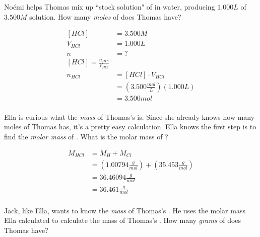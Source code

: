 \documentclass[11pt,addpoints]{exam}   	%
\begin{document}
\begin{questions}
\vspace{0.2in}


\question[5] No\'emi helps Thomas mix up ``stock solution" of  in water, producing $1.000 L$ of $3.500 M$  solution.
How many \emph{moles} of  does Thomas have?

\begin{solution}
\begin{equation} 
\begin{split}
    [HCl] &= 3.500 M \\
    V_{HCl} &= 1.000 L\\
    n &= ?\\
    [HCl] = \frac{n_{HCl}}{V_{HCl}} \\
    n_{HCl} &= [HCl] \cdot V_{HCl} \\
                 &= (3.500 \frac{mol}{L})(1.000 L) \\
                 &= 3.500 mol \\
 \end{split}
 \end{equation}
\end{solution}

\vspace{0.2in}


\question[5] Ella is curious what the \emph{mass} of Thomas's  is. Since she already knows how many moles of  Thomas has, it's a pretty easy calculation.
Ella knows the first step is to find the \emph{molar mass} of .
What is the molar mass of ?

\begin{solution}
\begin{equation} 
\begin{split}
    M_{HCl} &= M_{H} + M_{Cl} \\
                  &= (1.00794 \frac{g}{mol}) + (35.453 \frac{g}{mol}) \\
                  &= 36.46094 \frac{g}{mol} \\
                  &= 36.461 \frac{g}{mol} \\
 \end{split}
 \end{equation}
\end{solution}

\vspace{0.2in}

\question[5] Jack, like Ella, wants to know the \emph{mass} of Thomas's . He uses the molar mass Ella calculated to calculate the mass of Thomas's .
How many \emph{grams} of  does Thomas have?


\end{questions}
\end{document}
